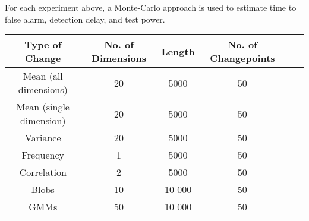 For each experiment above, a Monte-Carlo approach is used to estimate time to false alarm, detection delay, and test power. 

\begin{center}
\begin{tabular}{SSSSSS} \toprule
    {Type of Change} & {No. of Dimensions} & {Length} & {No. of Changepoints}  \\ \midrule
    {Mean (all dimensions)}  & 20 & 5000 & 50  \\
    {Mean (single dimension)}  & 20 & 5000 & 50  \\
    {Variance}  & 20 & 5000 & 50  \\
    {Frequency}  & 1 & 5000  & 50  \\
    {Correlation} & 2 & 5000  & 50  \\
    {Blobs}  & 10 & 10 000  & 50  \\
    {GMMs}  & 50 & 10 000  & 50  \\ \bottomrule
\end{tabular}
\end{center}



